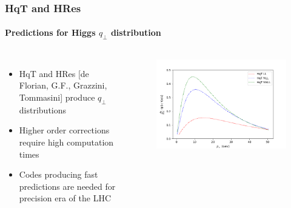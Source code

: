 \documentclass[aspectratio=43]{beamer}
\begin{document}
\begin{frame}


\end{frame}

\begin{frame}

	\frametitle{HqT and HRes}
	\framesubtitle{Predictions for Higgs $q_{\perp}$ distribution}
	
	\begin{columns}
		
			
		\begin{itemize}
			\item HqT and HRes {\color{blue}[de Florian, G.F., Grazzini, Tommasini]} produce $q_{\perp}$ distributions
			\item Higher order corrections require {\color{red}high computation times}
			\item Codes producing fast predictions are needed for precision era of the LHC
		\end{itemize}

	
		\begin{figure}
			\includegraphics[width = 7 cm]{plots/higgs_qt_all.png}
		\end{figure}		
			
	\end{columns}

\end{frame}
\end{document}
